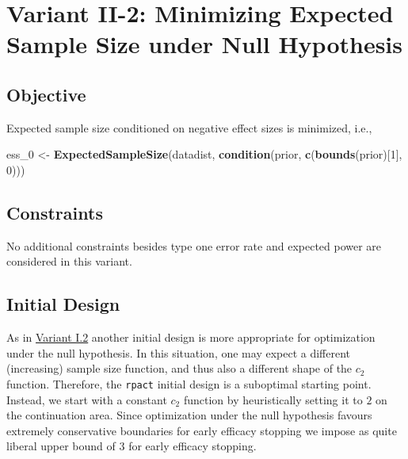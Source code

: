 \documentclass[
]{book}
\newenvironment{Shaded}{\begin{snugshade}}{\end{snugshade}}
\newcommand{\DecValTok}[1]{\textcolor[rgb]{0.00,0.00,0.81}{#1}}
\newcommand{\KeywordTok}[1]{\textcolor[rgb]{0.13,0.29,0.53}{\textbf{#1}}}
\newcommand{\NormalTok}[1]{#1}
\newcommand{\StringTok}[1]{\textcolor[rgb]{0.31,0.60,0.02}{#1}}
\begin{document}
\hypertarget{variantII_2}{%
\section{Variant II-2: Minimizing Expected Sample Size under Null Hypothesis}\label{variantII_2}}

\hypertarget{objective-4}{%
\subsection{Objective}\label{objective-4}}

Expected sample size conditioned on negative effect sizes is minimized, i.e.,

\begin{Shaded}
\begin{Highlighting}[]
\NormalTok{ess\_}\DecValTok{0}\NormalTok{ \textless{}{-}}\StringTok{ }\KeywordTok{ExpectedSampleSize}\NormalTok{(datadist, }\KeywordTok{condition}\NormalTok{(prior, }\KeywordTok{c}\NormalTok{(}\KeywordTok{bounds}\NormalTok{(prior)[}\DecValTok{1}\NormalTok{], }\DecValTok{0}\NormalTok{)))}
\end{Highlighting}
\end{Shaded}

\hypertarget{constraints-4}{%
\subsection{Constraints}\label{constraints-4}}

No additional constraints besides type one error rate and expected power
are considered in this variant.

\hypertarget{initial-design-3}{%
\subsection{Initial Design}\label{initial-design-3}}

As in \protect\hyperlink{variantI_2}{Variant I.2} another initial design is more appropriate
for optimization under the null hypothesis.
In this situation, one may expect a different (increasing) sample size function,
and thus also a different shape of the \(c_2\) function.
Therefore, the \texttt{rpact} initial design is a suboptimal starting point.
Instead, we start with a constant \(c_2\) function by heuristically
setting it to \(2\) on the continuation area.
Since optimization under the null hypothesis favours extremely conservative
boundaries for early efficacy stopping we impose as quite liberal upper bound
of \(3\) for early efficacy stopping.
\end{document}
